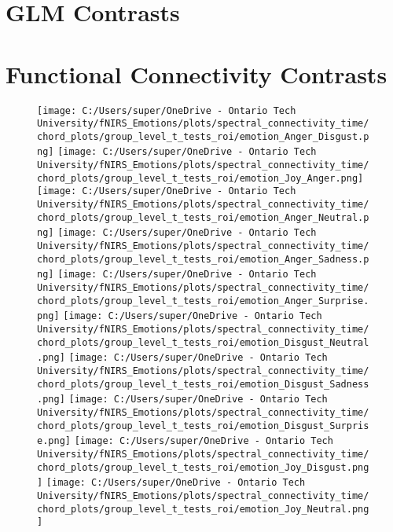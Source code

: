 \chapter{GLM Contrasts}
\label{tab:appendix_glm_results}


\chapter{Functional Connectivity Contrasts}
\begin{figure}[H]
    \centering
    \texttt{[image: C:/Users/super/OneDrive - Ontario Tech University/fNIRS\_Emotions/plots/spectral\_connectivity\_time/chord\_plots/group\_level\_t\_tests\_roi/emotion\_Anger\_Disgust.png]}
    \texttt{[image: C:/Users/super/OneDrive - Ontario Tech University/fNIRS\_Emotions/plots/spectral\_connectivity\_time/chord\_plots/group\_level\_t\_tests\_roi/emotion\_Joy\_Anger.png]}
    \texttt{[image: C:/Users/super/OneDrive - Ontario Tech University/fNIRS\_Emotions/plots/spectral\_connectivity\_time/chord\_plots/group\_level\_t\_tests\_roi/emotion\_Anger\_Neutral.png]}
    \texttt{[image: C:/Users/super/OneDrive - Ontario Tech University/fNIRS\_Emotions/plots/spectral\_connectivity\_time/chord\_plots/group\_level\_t\_tests\_roi/emotion\_Anger\_Sadness.png]}
    \texttt{[image: C:/Users/super/OneDrive - Ontario Tech University/fNIRS\_Emotions/plots/spectral\_connectivity\_time/chord\_plots/group\_level\_t\_tests\_roi/emotion\_Anger\_Surprise.png]}
    \texttt{[image: C:/Users/super/OneDrive - Ontario Tech University/fNIRS\_Emotions/plots/spectral\_connectivity\_time/chord\_plots/group\_level\_t\_tests\_roi/emotion\_Disgust\_Neutral.png]}
    \texttt{[image: C:/Users/super/OneDrive - Ontario Tech University/fNIRS\_Emotions/plots/spectral\_connectivity\_time/chord\_plots/group\_level\_t\_tests\_roi/emotion\_Disgust\_Sadness.png]}
    \texttt{[image: C:/Users/super/OneDrive - Ontario Tech University/fNIRS\_Emotions/plots/spectral\_connectivity\_time/chord\_plots/group\_level\_t\_tests\_roi/emotion\_Disgust\_Surprise.png]}
    \texttt{[image: C:/Users/super/OneDrive - Ontario Tech University/fNIRS\_Emotions/plots/spectral\_connectivity\_time/chord\_plots/group\_level\_t\_tests\_roi/emotion\_Joy\_Disgust.png]}
    \texttt{[image: C:/Users/super/OneDrive - Ontario Tech University/fNIRS\_Emotions/plots/spectral\_connectivity\_time/chord\_plots/group\_level\_t\_tests\_roi/emotion\_Joy\_Neutral.png]}

\end{figure}
